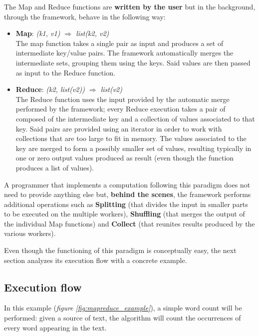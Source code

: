 The Map and Reduce functions are \textbf{written by the user} but in the background, through the framework, behave in the following way:
\begin{itemize}
    \item \textbf{Map}: \textit{(k1, v1) $\Longrightarrow$ list(k2, v2)}\\
    The map function takes a single pair as input and produces a set of intermediate key/value pairs. The framework automatically merges the intermediate sets, grouping them using the keys. Said values are then passed as input to the Reduce function.
    \item \textbf{Reduce}: \textit{(k2, list(v2)) $\Longrightarrow$ list(v2)}\\
    The Reduce function uses the input provided by the automatic merge performed by the framework; every Reduce execution takes a pair of composed of the intermediate key and a collection of values associated to that key. Said pairs are provided using an iterator in order to work with collections that are too large to fit in memory. The values associated to the key are merged to form a possibly smaller set of values, resulting typically in one or zero output values produced as result (even though the function produces a list of values).
\end{itemize}
A programmer that implements a computation following this paradigm does not need to provide anything else but, \textbf{behind the scenes}, the framework performs additional operations such as \textbf{Splitting} (that divides the input in smaller parts to be executed on the multiple workers), \textbf{Shuffling} (that merges the output of the individual Map functions) and \textbf{Collect} (that reunites results produced by the various workers).

Even though the functioning of this paradigm is conceptually easy, the next section analyzes its execution flow with a concrete example.

\subsection{Execution flow}
In this example (\textit{figure \ref{fig:mapreduce_example}}), a simple word count will be performed: given a source of text, the algorithm will count the occurrences of every word appearing in the text.


